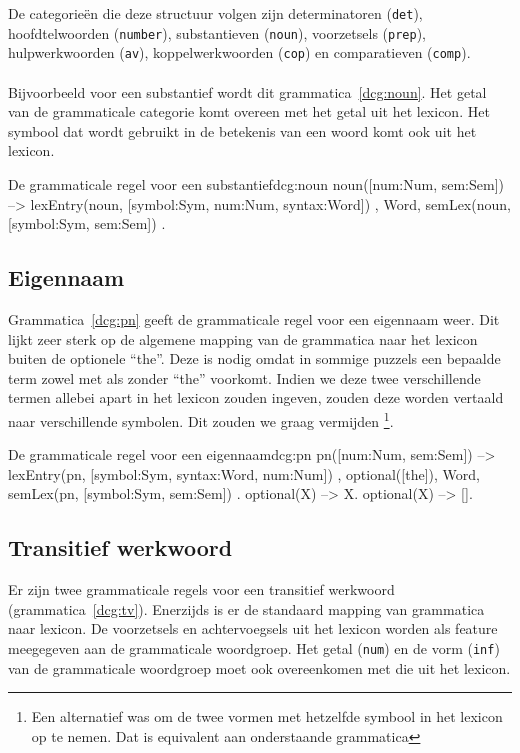 De categorieën die deze structuur volgen zijn determinatoren (\texttt{det}), hoofdtelwoorden (\texttt{number}), substantieven (\texttt{noun}), voorzetsels (\texttt{prep}), hulpwerkwoorden (\texttt{av}), koppelwerkwoorden (\texttt{cop}) en comparatieven (\texttt{comp}).

\paragraph{}Bijvoorbeeld voor een substantief wordt dit grammatica~\ref{dcg:noun}. Het getal van de grammaticale categorie komt overeen met het getal uit het lexicon. Het symbool dat wordt gebruikt in de betekenis van een woord komt ook uit het lexicon.
\begin{dcg}{De grammaticale regel voor een substantief}{dcg:noun}
noun([num:Num, sem:Sem]) -->
  { lexEntry(noun, [symbol:Sym, num:Num, syntax:Word]) },
  Word,
  { semLex(noun, [symbol:Sym, sem:Sem]) }.
\end{dcg}

\subsection{Eigennaam}
Grammatica~\ref{dcg:pn} geeft de grammaticale regel voor een eigennaam weer. Dit lijkt zeer sterk op de algemene mapping van de grammatica naar het lexicon buiten de optionele ``the''. Deze is nodig omdat in sommige puzzels een bepaalde term zowel met als zonder ``the'' voorkomt. Indien we deze twee verschillende termen allebei apart in het lexicon zouden ingeven, zouden deze worden vertaald naar verschillende symbolen. Dit zouden we graag vermijden \footnote{Een alternatief was om de twee vormen met hetzelfde symbool in het lexicon op te nemen. Dat is equivalent aan onderstaande grammatica}.

\begin{dcg}{De grammaticale regel voor een eigennaam}{dcg:pn}
pn([num:Num, sem:Sem]) -->
  { lexEntry(pn, [symbol:Sym, syntax:Word, num:Num]) },
  optional([the]),
  Word,
  { semLex(pn, [symbol:Sym, sem:Sem]) }.
optional(X) -->
  X.
optional(X) -->
  [].
\end{dcg}

\subsection{Transitief werkwoord}
\label{sec:gramm-tv}
Er zijn twee grammaticale regels voor een transitief werkwoord (grammatica~\ref{dcg:tv}). Enerzijds is er de standaard mapping van grammatica naar lexicon. De voorzetsels en achtervoegsels uit het lexicon worden als feature meegegeven aan de grammaticale woordgroep. Het getal (\texttt{num}) en de vorm (\texttt{inf}) van de grammaticale woordgroep moet ook overeenkomen met die uit het lexicon.

